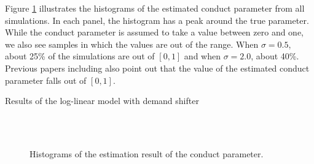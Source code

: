 \documentclass[11pt, a4paper]{article}
\begin{document}
Figure \ref{fg:histogram_loglinear_loglinear_no_constraint} illustrates the histograms of the estimated conduct parameter from all simulations.
In each panel, the histogram has a peak around the true parameter.
While the conduct parameter is assumed to take a value between zero and one, we also see samples in which the values are out of the range. 
When $\sigma = 0.5$, about 25\% of the simulations are out of $[0,1]$ and when $\sigma = 2.0$, about 40\%. 
Previous papers including \citet{okazaki2022excess} also point out that the value of the estimated conduct parameter falls out of $[0,1]$.

\begin{table}[!htbp]
      \begin{center}
          \caption{Results of the log-linear model with demand shifter}
          \label{tb:loglinear_loglinear_non_constraint} 
          \subfloat[$\sigma=0.001$]{}\\
          \subfloat[$\sigma=0.5$]{}\\
            \subfloat[$\sigma=2.0$]{}
      \end{center}
\end{table} 


\begin{figure}[!htbp]
  \begin{center}
  \caption{Histograms of the estimation result of the conduct parameter.}
  \label{fg:histogram_loglinear_loglinear_no_constraint} 
  \end{center}
\end{figure}
\end{document}
